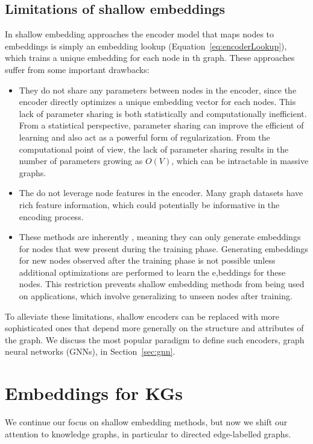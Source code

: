 \subsection{Limitations of shallow embeddings}
In shallow embedding approaches the encoder model that maps nodes to embeddings is simply an embedding lookup (Equation~\eqref{eq:encoderLookup}), which trains a unique embedding for each node in th graph. These approaches suffer from some important drawbacks:
\begin{itemize}
    \item They do not share any parameters between nodes in the encoder, since the encoder directly optimizes a unique embedding vector for each nodes. This lack of parameter sharing is both statistically and computationally inefficient. From a statistical perspective, parameter sharing can improve the efficient of learning and also act as a powerful form of regularization. From the computational point of view, the lack of parameter sharing results in the number of parameters growing as $O(V)$, which can be intractable in massive graphs.
    \item The do not leverage node features in the encoder. Many graph datasets have rich feature information, which could potentially be informative in the encoding process.
    \item These methods are inherently , meaning they can only generate embeddings for nodes that wew present during the training phase. Generating embeddings for new nodes observed after the training phase is not possible unless additional optimizations are performed to learn the e,beddings for these nodes. This restriction prevents shallow embedding methods from being used on  applications, which involve generalizing to unseen nodes after training.
\end{itemize}
To alleviate these limitations, shallow encoders can be replaced with more sophisticated ones that depend more generally on the structure and attributes of the graph. We discuss the most popular paradigm to define such encoders, graph neural networks (GNNs), in Section~\ref{sec:gnn}.

\section{Embeddings for KGs}
We continue our focus on shallow embedding methods, but now we shift our attention to knowledge graphs, in particular to directed edge-labelled graphs.

